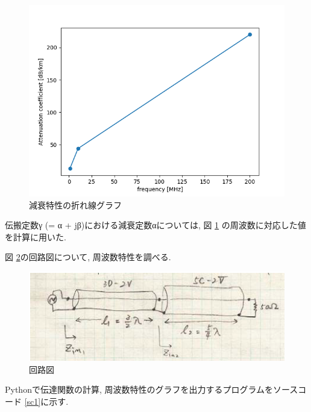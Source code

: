 \documentclass[a4j,12pt,]{jarticle}
\begin{document}
\begin{figure}[H]
  \begin{center}
    \includegraphics[width=140mm]{attenuation_coefficient.png}
    \caption{減衰特性の折れ線グラフ}
    \label{p2}
  \end{center}
\end{figure}

伝搬定数γ (= α + jβ)における減衰定数αについては, 図 \ref{p2} の周波数に対応した値を計算に用いた.

図 \ref{p3}の回路図について, 周波数特性を調べる.

\begin{figure}[H]
  \begin{center}
    \includegraphics[width=140mm]{circuit.png}
    \caption{回路図}
    \label{p3}
  \end{center}
\end{figure}

Pythonで伝達関数の計算, 周波数特性のグラフを出力するプログラムをソースコード \ref{sc1}に示す.


\end{document}

